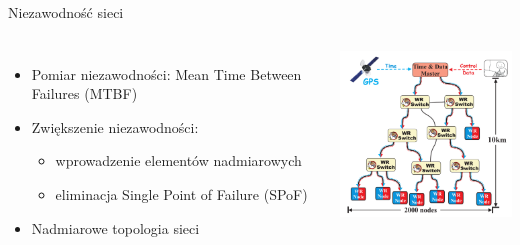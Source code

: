 \documentclass[compress,red]{beamer}
\begin{document}
\begin{frame}{Niezawodność sieci}


  \begin{columns}[c]

  \begin{itemize}
    \item Pomiar niezawodności: Mean Time Between Failures (MTBF)
    \item Zwiększenie niezawodności:
    \begin{itemize}
      \item wprowadzenie elementów nadmiarowych
      \item eliminacja Single Point of Failure (SPoF)
    \end{itemize}
    \item Nadmiarowe topologia sieci
  \end{itemize}

      \vspace{2cm}


      \begin{center}
      \includegraphics[width=6cm]{network/wr_network-new.pdf}
      \end{center}

      \vspace{2cm}

  \end{columns}

\end{frame}
\end{document}
